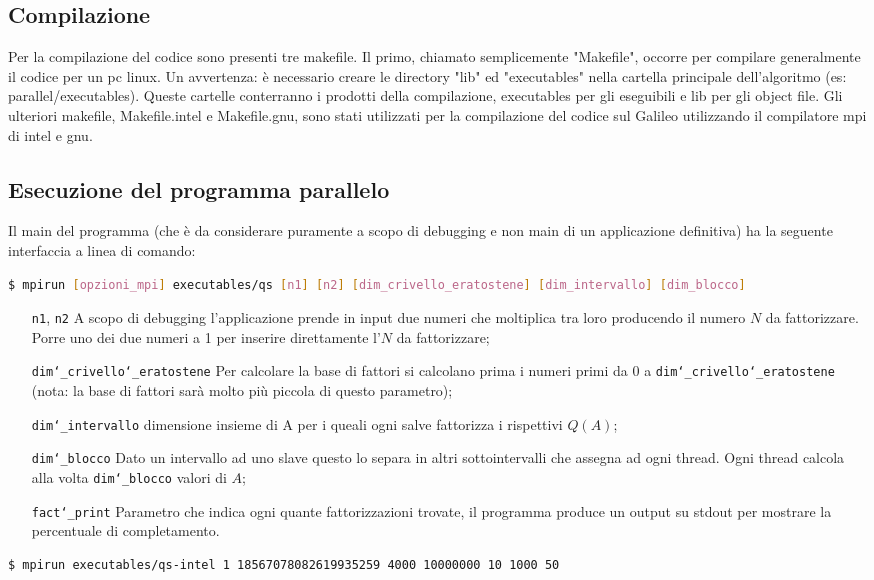 \subsection{Compilazione}
Per la compilazione del codice sono presenti tre makefile.
Il primo, chiamato semplicemente "Makefile", occorre per compilare
generalmente il codice per un pc linux. Un avvertenza: è necessario
creare le directory "lib" ed "executables" nella cartella principale
dell'algoritmo (es: parallel/executables). Queste cartelle conterranno i
prodotti della compilazione, executables per gli eseguibili e lib per
gli object file.
Gli ulteriori makefile, Makefile.intel e Makefile.gnu, sono stati
utilizzati per la compilazione del codice sul Galileo utilizzando
il compilatore mpi di intel e gnu.
\subsection{Esecuzione del programma parallelo}
Il main del programma (che è da considerare puramente
a scopo di debugging e non main di un applicazione definitiva)
ha la seguente interfaccia a linea di comando:
\begin{lstlisting}[language=bash]
  $ mpirun [opzioni_mpi] executables/qs [n1] [n2] [dim_crivello_eratostene] [dim_intervallo] [dim_blocco]
\end{lstlisting}
\begin{itemize}
\item[\texttt{n1}, \texttt{n2}] A scopo di debugging l'applicazione prende
in input due numeri che moltiplica tra loro producendo il numero $N$
da fattorizzare. Porre uno dei due numeri a 1 per inserire
direttamente l'$N$ da fattorizzare;
\item[\texttt{dim\char`_crivello\char`_eratostene}] Per calcolare la
base di fattori si calcolano prima i numeri primi da  
0 a \texttt{dim\char`_crivello\char`_eratostene} (nota: la base di fattori sarà molto più
piccola di questo parametro);
\item[\texttt{dim\char`_intervallo}] dimensione insieme di A per i queali ogni salve
fattorizza i rispettivi $Q(A)$; 
\item[\texttt{dim\char`_blocco}] Dato un intervallo ad uno slave questo lo separa in
altri sottointervalli che assegna ad ogni thread. Ogni thread calcola
alla volta \texttt{dim\char`_blocco} valori di $A$;
\item[\texttt{fact\char`_print}] Parametro che indica ogni quante fattorizzazioni trovate, il programma produce un
output su stdout per mostrare la percentuale di completamento.
\end{itemize}
\begin{lstlisting}[language=bash]
$ mpirun executables/qs-intel 1 18567078082619935259 4000 10000000 10 1000 50
\end{lstlisting}
